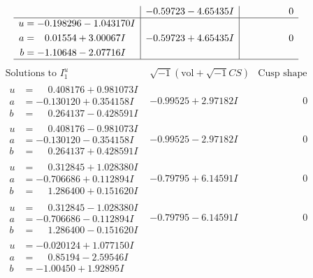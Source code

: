 \documentclass[1p]{elsarticle_modified}
\theoremstyle{definition}
\newcommand{\I}{\sqrt{-1}}
\begin{document}
$$\begin{array}{c|c|c}
 & -0.59723 - 4.65435 I & \phantom{-0.000000 } 0 \\ \hline\begin{aligned}
u &= -0.198296 - 1.043170 I \\
a &= \phantom{-}0.01554 + 3.00067 I \\
b &= -1.10648 - 2.07716 I\end{aligned}
 & -0.59723 + 4.65435 I & \phantom{-0.000000 } 0\\
 \hline 
 \end{array}$$\newpage$$\begin{array}{c|c|c}  
\text{Solutions to }I^u_{1}& \I (\text{vol} + \sqrt{-1}CS) & \text{Cusp shape}\\
 \hline 
\begin{aligned}
u &= \phantom{-}0.408176 + 0.981073 I \\
a &= -0.130120 + 0.354158 I \\
b &= \phantom{-}0.264137 - 0.428591 I\end{aligned}
 & -0.99525 + 2.97182 I & \phantom{-0.000000 } 0 \\ \hline\begin{aligned}
u &= \phantom{-}0.408176 - 0.981073 I \\
a &= -0.130120 - 0.354158 I \\
b &= \phantom{-}0.264137 + 0.428591 I\end{aligned}
 & -0.99525 - 2.97182 I & \phantom{-0.000000 } 0 \\ \hline\begin{aligned}
u &= \phantom{-}0.312845 + 1.028380 I \\
a &= -0.706686 + 0.112894 I \\
b &= \phantom{-}1.286400 + 0.151620 I\end{aligned}
 & -0.79795 + 6.14591 I & \phantom{-0.000000 } 0 \\ \hline\begin{aligned}
u &= \phantom{-}0.312845 - 1.028380 I \\
a &= -0.706686 - 0.112894 I \\
b &= \phantom{-}1.286400 - 0.151620 I\end{aligned}
 & -0.79795 - 6.14591 I & \phantom{-0.000000 } 0 \\ \hline\begin{aligned}
u &= -0.020124 + 1.077150 I \\
a &= \phantom{-}0.85194 - 2.59546 I \\
b &= -1.00450 + 1.92895 I\end{aligned}

\end{array}$$
\end{document}
